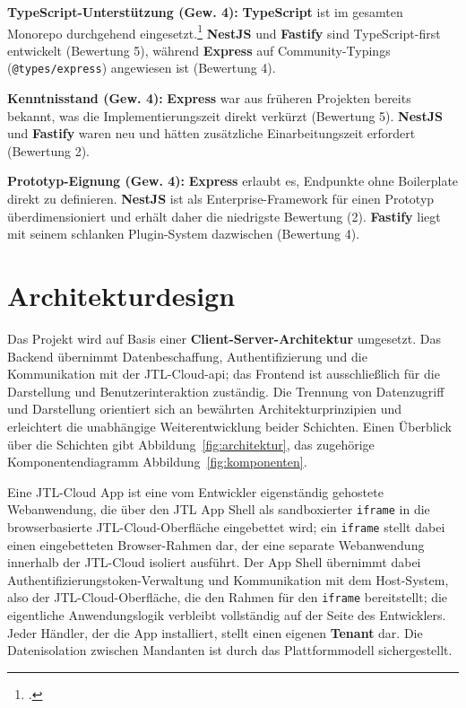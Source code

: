 \documentclass[11pt, a4paper, oneside]{report}
\begin{document}
\textbf{TypeScript-Unterstützung (Gew. 4):} \textbf{TypeScript} ist im gesamten
Monorepo durchgehend eingesetzt.\footcite{typescript_docs} \textbf{NestJS} und \textbf{Fastify} sind TypeScript-first
entwickelt (Bewertung 5), während \textbf{Express} auf Community-Typings
(\texttt{@types/express}) angewiesen ist (Bewertung 4).

\textbf{Kenntnisstand (Gew. 4):} \textbf{Express} war aus früheren Projekten bereits
bekannt, was die Implementierungszeit direkt verkürzt (Bewertung 5).
\textbf{NestJS} und \textbf{Fastify} waren neu und hätten zusätzliche Einarbeitungszeit
erfordert (Bewertung 2).

\textbf{Prototyp-Eignung (Gew. 4):} \textbf{Express} erlaubt es, Endpunkte ohne
Boilerplate direkt zu definieren. \textbf{NestJS} ist als Enterprise-Framework für einen
Prototyp überdimensioniert und erhält daher die niedrigste Bewertung (2).
\textbf{Fastify} liegt mit seinem schlanken Plugin-System dazwischen (Bewertung 4).

\section{Architekturdesign}

Das Projekt wird auf Basis einer \textbf{Client-Server-Architektur} umgesetzt.
Das Backend übernimmt Datenbeschaffung, Authentifizierung und die Kommunikation
mit der JTL-Cloud-\gls{api}; das Frontend ist ausschließlich für die Darstellung
und Benutzerinteraktion zuständig. Die Trennung von Datenzugriff und Darstellung
orientiert sich an bewährten Architekturprinzipien und erleichtert die
unabhängige Weiterentwicklung beider Schichten. Einen Überblick über die Schichten
gibt Abbildung~\ref{fig:architektur}, das zugehörige Komponentendiagramm
Abbildung~\ref{fig:komponenten}.

Eine JTL-Cloud App ist eine vom Entwickler eigenständig gehostete
Webanwendung, die über den JTL App Shell als sandboxierter \texttt{iframe}
in die browserbasierte JTL-Cloud-Oberfläche eingebettet wird; ein
\texttt{iframe} stellt dabei einen eingebetteten Browser-Rahmen dar, der
eine separate Webanwendung innerhalb der JTL-Cloud isoliert ausführt.
Der App Shell übernimmt dabei Authentifizierungstoken-Verwaltung und Kommunikation
mit dem Host-System, also der JTL-Cloud-Oberfläche, die den Rahmen
für den \texttt{iframe} bereitstellt;
die eigentliche Anwendungslogik verbleibt vollständig auf der Seite des
Entwicklers. Jeder Händler, der die App installiert, stellt einen eigenen
\textbf{Tenant} dar. Die Datenisolation zwischen Mandanten ist durch das
Plattformmodell sichergestellt.
\end{document}

